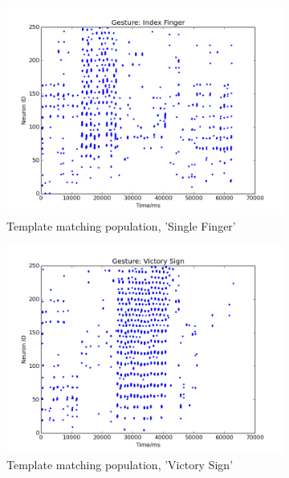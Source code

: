 \documentclass[journal]{journal}
\begin{document}
\begin{figure}
\begin{subfigure}[t]{0.24\textwidth}
		\includegraphics[width=\textwidth]{pics/figure_2.png}
		\caption{Template matching population, 'Single Finger'}
	    \label{fig:rec1}
	\end{subfigure}	
	\begin{subfigure}[t]{0.24\textwidth}
		\includegraphics[width=\textwidth]{pics/figure_3.png}
		\caption{Template matching population, 'Victory Sign'}
	\end{subfigure}	
	\\
	\begin{subfigure}[t]{0.24\textwidth}

\end{subfigure}
\end{figure}
\end{document}
